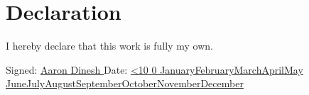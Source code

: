 \documentclass[a4paper,oneside,12pt]{book}
\title{\thesistitle}
\author{\authorname}
\numberwithin{equation}{chapter} %
\renewcommand{\today}{\ifnum\number\day<10 0\fi \number\day \space%
\ifcase \month \or January\or February\or March\or April\or May%
\or June\or July\or August\or September\or October\or November\or December\fi \space%
\number \year}
\begin{document}

\section*{\Huge\textcolor{tcd_blue}{Declaration}}
I hereby declare that this work is fully my own.
\vspace{1cm}

Signed: \uline{\hfill Aaron Dinesh \hfill} Date: \uline{\hfill \today \hfill}

\newpage

\end{document}
